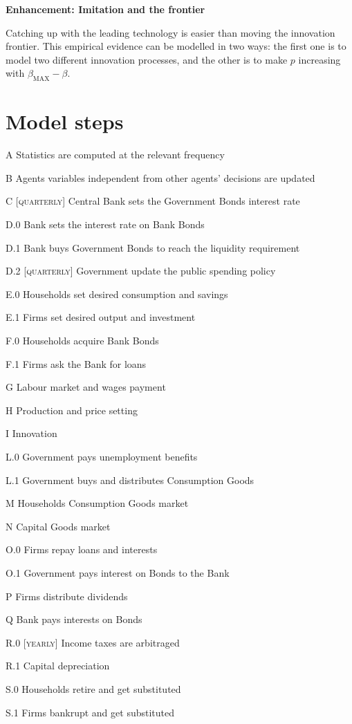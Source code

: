 \documentclass[a4paper, headings=standardclasses]{scrartcl}
\newenvironment{enh}[1][]{\begin{framed}\noindent\textbf{Enhancement: #1}\par}{\end{framed}}
\begin{document}
\begin{enh}[Imitation and the frontier]
	Catching up with the leading technology is easier than moving the innovation frontier. This empirical evidence can be modelled in two ways: the first one is to model two different innovation processes, and the other is to make $p$ increasing with $\beta_\text{MAX} - \beta$.
\end{enh}

\section{Model steps}
\begin{steps}
	\item[A] Statistics are computed at the relevant frequency
	\item[B] Agents variables independent from other agents' decisions are updated
	\item[C] [\textsc{quarterly}] Central Bank sets the Government Bonds interest rate
	\item[D.0] Bank sets the interest rate on Bank Bonds
	\item[D.1] Bank buys Government Bonds to reach the liquidity requirement
	\item[D.2] [\textsc{quarterly}] Government update the public spending policy
	\item[E.0] Households set desired consumption and savings
	\item[E.1] Firms set desired output and investment
	\item[F.0] Households acquire Bank Bonds
	\item[F.1] Firms ask the Bank for loans
	\item[G] Labour market and wages payment
	\item[H] Production and price setting
	\item[I] Innovation
	\item[L.0] Government pays unemployment benefits
	\item[L.1] Government buys and distributes Consumption Goods
	\item[M] Households Consumption Goods market
	\item[N] Capital Goods market
	\item[O.0] Firms repay loans and interests
	\item[O.1] Government pays interest on Bonds to the Bank
	\item[P] Firms distribute dividends
	\item[Q] Bank pays interests on Bonds
	\item[R.0] [\textsc{yearly}] Income taxes are arbitraged
	\item[R.1] Capital depreciation
	\item[S.0] Households retire and get substituted
	\item[S.1] Firms bankrupt and get substituted
\end{steps}
\end{document}

